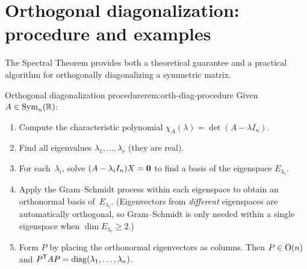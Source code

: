 \section{Orthogonal diagonalization: procedure and examples}%
\label{sec:orth-diag}

The Spectral Theorem provides both a theoretical guarantee and a
practical algorithm for orthogonally diagonalizing a symmetric matrix.

\begin{remark}{Orthogonal diagonalization procedure}{rem:orth-diag-procedure}
Given $A\in\operatorname{Sym}_n({\mathbb{R}})$:
\begin{enumerate}
  \item Compute the characteristic polynomial
    $\chi_A(\lambda) = \det(A - \lambda I_n)$.
  \item Find all eigenvalues $\lambda_1,\ldots,\lambda_r$ (they are real).
  \item For each~$\lambda_i$, solve $(A - \lambda_i I_n)X = \mathbf{0}$ to
    find a basis of the eigenspace $E_{\lambda_i}$.
  \item Apply the Gram--Schmidt process within each eigenspace to obtain
    an orthonormal basis of~$E_{\lambda_i}$.
    (Eigenvectors from \emph{different} eigenspaces are automatically
    orthogonal, so Gram--Schmidt is only needed within a single
    eigenspace when $\dim E_{\lambda_i}\geq 2$.)
  \item Form $P$ by placing the orthonormal eigenvectors as columns.
    Then $P\in\operatorname{O}(n)$ and ${P}^{\mathsf{T}}AP = \operatorname{diag}(\lambda_1,\ldots,\lambda_n)$.
\end{enumerate}
\end{remark}

